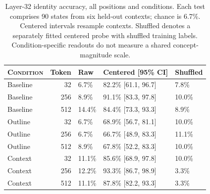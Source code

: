 \begin{table}[htbp]
\centering\small
\begin{tabular}{@{}lrlll@{}}
\toprule
\textsc{Condition} & Token & Raw & Centered [95\% CI] & Shuffled \\
\midrule
Baseline & 32 & 6.7\% & 82.2\% [61.1, 96.7] & 7.8\% \\
Baseline & 256 & 8.9\% & 91.1\% [83.3, 97.8] & 10.0\% \\
Baseline & 512 & 14.4\% & 84.4\% [73.3, 93.3] & 8.9\% \\
Outline & 32 & 6.7\% & 68.9\% [56.7, 81.1] & 10.0\% \\
Outline & 256 & 6.7\% & 66.7\% [48.9, 83.3] & 11.1\% \\
Outline & 512 & 8.9\% & 67.8\% [52.2, 83.3] & 10.0\% \\
Context & 32 & 11.1\% & 85.6\% [68.9, 97.8] & 10.0\% \\
Context & 256 & 12.2\% & 93.3\% [86.7, 98.9] & 3.3\% \\
Context & 512 & 11.1\% & 87.8\% [82.2, 93.3] & 3.3\% \\
\bottomrule
\end{tabular}
\caption{Layer-32 identity accuracy, all positions and conditions. Each test comprises 90 states from six held-out contexts; chance is 6.7\%. Centered intervals resample contexts. Shuffled denotes a separately fitted centered probe with shuffled training labels. Condition-specific readouts do not measure a shared concept-magnitude scale.}
\label{tab:probes}
\end{table}
